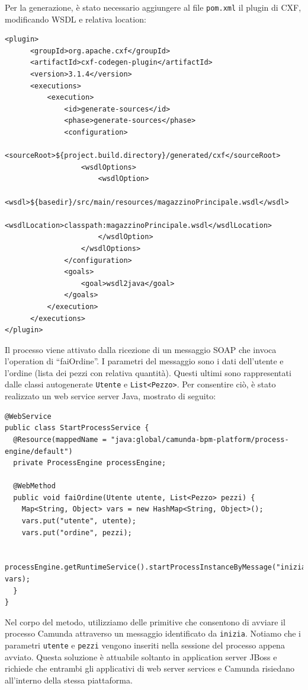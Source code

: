 \documentclass[twoside]{article}
\begin{document}
Per la generazione, è stato necessario aggiungere al file \texttt{pom.xml}
il plugin di CXF, modificando WSDL e relativa location:
\begin{lstlisting}
<plugin>
      <groupId>org.apache.cxf</groupId>
      <artifactId>cxf-codegen-plugin</artifactId>
      <version>3.1.4</version>
      <executions>
          <execution>
              <id>generate-sources</id>
              <phase>generate-sources</phase>
              <configuration>
                  <sourceRoot>${project.build.directory}/generated/cxf</sourceRoot>
                  <wsdlOptions>
                      <wsdlOption>
                          <wsdl>${basedir}/src/main/resources/magazzinoPrincipale.wsdl</wsdl>
                          <wsdlLocation>classpath:magazzinoPrincipale.wsdl</wsdlLocation>
                      </wsdlOption>
                  </wsdlOptions>
              </configuration>
              <goals>
                  <goal>wsdl2java</goal>
              </goals>
          </execution>
      </executions>
</plugin>
\end{lstlisting}

Il processo viene attivato dalla ricezione di un messaggio SOAP che invoca l'operation di ``faiOrdine''.
I parametri del messaggio sono i dati dell'utente e l'ordine (lista dei pezzi con relativa quantità).
Questi ultimi sono rappresentati dalle classi autogenerate \texttt{Utente} e \texttt{List<Pezzo>}.
Per consentire ciò, è stato realizzato un web service server Java, mostrato di seguito:
\begin{lstlisting}
@WebService
public class StartProcessService {
  @Resource(mappedName = "java:global/camunda-bpm-platform/process-engine/default")
  private ProcessEngine processEngine;

  @WebMethod
  public void faiOrdine(Utente utente, List<Pezzo> pezzi) {
    Map<String, Object> vars = new HashMap<String, Object>();
    vars.put("utente", utente);
    vars.put("ordine", pezzi);

    processEngine.getRuntimeService().startProcessInstanceByMessage("inizia", vars);
  }
}
\end{lstlisting}
Nel corpo del metodo, utilizziamo delle primitive che consentono di 
avviare il processo Camunda attraverso un messaggio identificato da \texttt{inizia}.
Notiamo che i parametri \texttt{utente} e \texttt{pezzi} vengono inseriti nella
sessione del processo appena avviato. Questa soluzione è attuabile soltanto in application
server JBoss e richiede che entrambi gli applicativi di web server services
e Camunda risiedano all'interno della stessa piattaforma.
\end{document}
